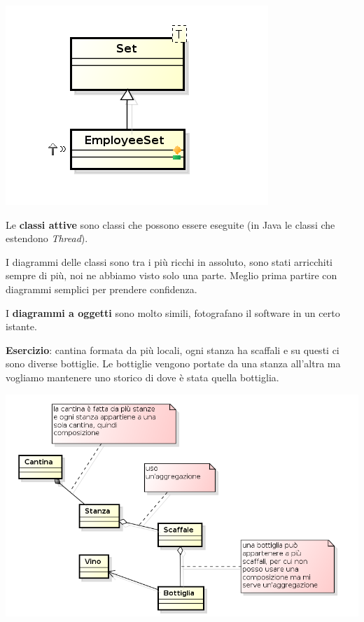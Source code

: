 \begin{center}

\includegraphics[width=0.75\columnwidth]{img2} %

\end{center}

Le \textbf{classi attive} sono classi che possono essere eseguite (in Java le classi che estendono \textit{Thread}).

I diagrammi delle classi sono tra i più ricchi in assoluto, sono stati arricchiti sempre di più, noi ne abbiamo visto solo una parte. Meglio prima partire con diagrammi semplici per prendere confidenza.

I \textbf{diagrammi a oggetti} sono molto simili, fotografano il software in un certo istante.

\textbf{Esercizio}: cantina formata da più locali, ogni stanza ha scaffali e su questi ci sono diverse bottiglie. Le bottiglie vengono portate da una stanza all'altra ma vogliamo mantenere uno storico di dove è stata quella bottiglia.

\begin{center}

\includegraphics[width=0.75\columnwidth]{img3} %

\end{center}

